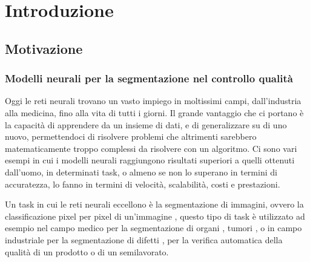 \chapter{Introduzione}

\section{Motivazione \ok}

\subsection{Modelli neurali per la segmentazione nel controllo qualità\ok}

Oggi le reti neurali trovano un vasto impiego in moltissimi campi, dall'industria alla medicina, fino alla vita di tutti i giorni.
Il grande vantaggio che ci portano è la capacità di apprendere da un insieme di dati, e di generalizzare su di uno nuovo,
permettendoci di risolvere problemi che altrimenti sarebbero matematicamente troppo complessi da risolvere con un algoritmo.
Ci sono vari esempi in cui i modelli neurali raggiungono risultati superiori a quelli ottenuti dall'uomo, in determinati task,
o almeno se non lo superano in termini di accuratezza, lo fanno in termini di velocità, scalabilità, costi e prestazioni.

Un task in cui le reti neurali eccellono è la segmentazione di immagini, ovvero la classificazione pixel per pixel di un'immagine \cite{minaee2020image},
questo tipo di task è utilizzato ad esempio nel campo medico per la segmentazione di organi \cite{lei2020deep}, tumori \cite{havaei2015brain}, o in campo industriale per la segmentazione di difetti \cite{wong2021automatic}, per la verifica automatica della qualità di un prodotto o di un semilavorato.

